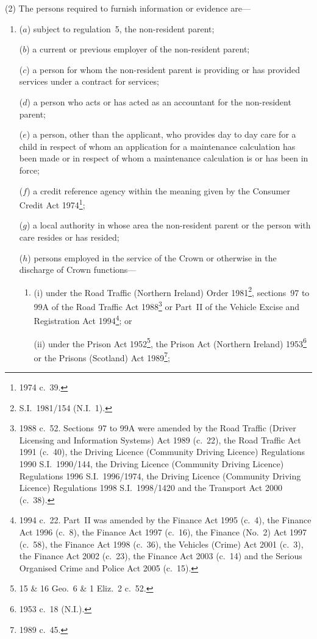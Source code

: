 \documentclass[12pt,a4paper]{article}
\begin{document}
(2) The persons required to furnish information or evidence are—
\begin{enumerate}\item[]
($a$) subject to regulation~5, the non-resident parent;

($b$) a current or previous employer of the non-resident parent;

($c$) a person for whom the non-resident parent is providing or has provided services under a contract for services;

($d$) a person who acts or has acted as an accountant for the non-resident parent;

($e$) a person, other than the applicant, who provides day to day care for a child in respect of whom an application for a maintenance calculation has been made or in respect of whom a maintenance calculation is or has been in force;

($f$) a credit reference agency within the meaning given by the Consumer Credit Act 1974\footnote{1974 c.~39.};

($g$) a local authority in whose area the non-resident parent or the person with care resides or has resided;

($h$) persons employed in the service of the Crown or otherwise in the discharge of Crown functions—
\begin{enumerate}\item[]
(i) under the Road Traffic (Northern Ireland) Order 1981\footnote{S.I.~1981/154 (N.I.~1).}, sections~97 to 99A of the Road Traffic Act 1988\footnote{1988 c.~52. Sections~97 to 99A were amended by the Road Traffic (Driver Licensing and Information Systems) Act 1989 (c.~22), the Road Traffic Act 1991 (c.~40), the Driving Licence (Community Driving Licence) Regulations 1990 S.I.~1990/144, the Driving Licence (Community Driving Licence) Regulations 1996 S.I.~1996/1974, the Driving Licence (Community Driving Licence) Regulations 1998 S.I.~1998/1420 and the Transport Act 2000 (c.~38).} or Part~II of the Vehicle Excise and Registration Act 1994\footnote{1994 c.~22. Part~II was amended by the Finance Act 1995 (c.~4), the Finance Act 1996 (c.~8), the Finance Act 1997 (c.~16), the Finance (No.~2) Act 1997 (c.~58), the Finance Act 1998 (c.~36), the Vehicles (Crime) Act 2001 (c.~3), the Finance Act 2002 (c.~23), the Finance Act 2003 (c.~14) and the Serious Organised Crime and Police Act 2005 (c.~15).}; or

(ii) under the Prison Act 1952\footnote{15 \& 16 Geo.~6 \& 1 Eliz.~2 c.~52.}, the Prison Act (Northern Ireland) 1953\footnote{1953 c.~18 (N.I.).} or the Prisons (Scotland) Act 1989\footnote{1989 c.~45.};
\end{enumerate}


\end{enumerate}
\end{document}
